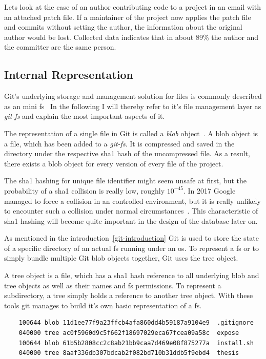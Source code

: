 Lets look at the case of an author contributing code to a project in an email with an attached patch file.
If a maintainer of the project now applies the patch file and commits without setting the author, the information about the original author would be lost.
Collected data indicates that in about 89\% the author and the committer are the same person.


\subsection{Internal Representation}
Git's underlying storage and management solution for files is commonly described as an mini \ac{fs}~\cite[p.~9]{book:pro-git}
In the following I will thereby refer to it's file management layer as \emph{git-fs} and explain the most important aspects of it.

The representation of a single file in Git is called a \emph{blob} object~\cite[p.~56]{book:pro-git}.
A blob object is a file, which has been added to a \emph{git-fs}.
It is compressed and saved in the  directory under the respective \ac{sha1} hash of the uncompressed file.
As a result, there exists a blob object for every version of every file of the project.

The \ac{sha1} hashing for unique file identifier might seem unsafe at first, but the probability of a \ac{sha1} collision is really low, roughly $10^{-45}$.
In 2017 Google managed to force a collision in an controlled environment, but it is really unlikely to encounter such a collision under normal circumstances~\cite{techreport:sha-collision}.
This characteristic of \ac{sha1} hashing will become quite important in the design of the database later on.

As mentioned in the introduction~\ref{git-introduction} Git is used to store the state of a specific directory of an actual \ac{fs} running under an \ac{os}.
To represent a \ac{fs} or to simply bundle multiple Git blob objects together, Git uses the tree object.

A tree object is a file, which has a \ac{sha1} hash reference to all underlying blob and tree objects as well as their names and \ac{fs} permissions.
To represent a subdirectory, a tree simply holds a reference to another tree object.
With these tools git manages to build it's own basic representation of a \ac{fs}.

\begin{verbatim}
    100644 blob 11d1ee77f9a23ffcb4afa860dd4b59187a9104e9  .gitignore
    040000 tree ac0f5960d9c5f662f18697029eca67fcea09a58c  expose
    100644 blob 61b5b2808cc2c8ab21bb9caa7d469e08f875277a  install.sh
    040000 tree 8aaf336db307bdcab2f082bd710b31ddb5f9ebd4  thesis
\end{verbatim}
\begingroup
{}
\endgroup

